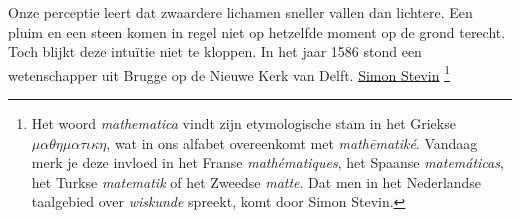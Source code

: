 \documentclass{ximera}
\begin{document}
	\author{Bart Lambregs}
    \xmsource\xmuitleg



	


 Onze perceptie leert dat zwaardere lichamen sneller vallen dan lichtere. 
 Een pluim en een steen komen in regel niet op hetzelfde moment op de grond terecht. 
 Toch blijkt deze intuïtie niet te kloppen.
 In het jaar 1586 stond een wetenschapper uit Brugge op de Nieuwe Kerk van Delft. 
 \href{https://www.canonvanvlaanderen.be/events/simon-stevin/}{Simon Stevin}%
 \footnote{Het woord \textit{mathematica} vindt zijn etymologische stam in het Griekse 
 $\mu \alpha \theta \eta \mu \alpha \tau \iota \kappa \eta$, wat in ons alfabet overeenkomt met \textit{math\=ematik\'e}. Vandaag merk je deze invloed in het Franse \textit{mathématiques}, het Spaanse \textit{matemáticas}, het Turkse \textit{matematik} of het Zweedse \textit{matte}. Dat men in het Nederlandse taalgebied over \textit{wiskunde} spreekt, komt door Simon Stevin.\footnotemark}
 
\end{document}
